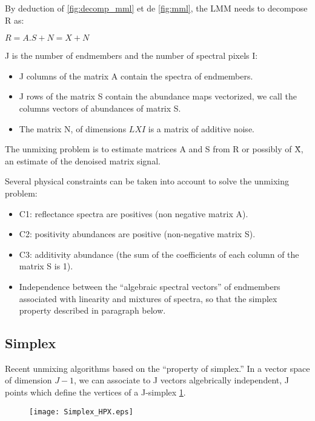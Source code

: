 By deduction of \ref{fig:decomp_mml} et de \ref{fig:mml}, the LMM needs to decompose R as: 
\begin{center}
$R= A.S + N = X + N$
\end{center}

J is the number of endmembers and the number of spectral pixels I:
 
\begin{itemize}
\item{J columns of the matrix A contain the spectra of endmembers.}
\item{J rows of the matrix S contain the abundance maps
vectorized, we call the columns vectors of abundances of
matrix S.}
\item{The matrix N, of dimensions $LXI$ is a matrix of additive noise.}
\end{itemize}

The unmixing problem is to estimate matrices A and S
from R or possibly of \"X, an estimate of the denoised matrix signal.

Several physical constraints can be taken into
account to solve the unmixing problem:
 
\begin{itemize}
\item{C1: reflectance spectra are positives (non negative matrix A).}
\item{C2: positivity abundances are positive (non-negative matrix S).}
\item{C3: additivity
abundance (the sum of the coefficients of each column of the matrix S is 1).}
\item{Independence between the ``algebraic spectral vectors'' of endmembers associated with linearity and mixtures of spectra, so that the simplex property described in paragraph below.}
\end{itemize}

\subsection{Simplex}  
Recent unmixing algorithms based on the ``property of
simplex.'' In a vector space of dimension $J-1$, we can
associate to J vectors algebrically independent, J points which define the vertices of a J-simplex \ref{fig:simplex}.

\begin{figure}[h]
  \centering
  \texttt{[image: Simplex\_HPX.eps]}
  \label{fig:simplex}
\end{figure}

